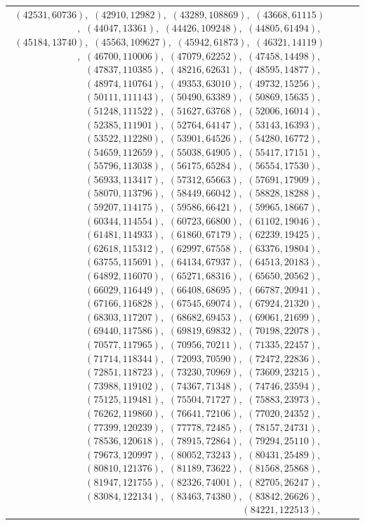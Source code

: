 \documentclass[11pt]{article}
\begin{document}
\begin{longtable}{@{}rrl>{\raggedright\arraybackslash}p{}@{}}
$(42531,60736)$,\allowbreak\ $(42910,12982)$,\allowbreak\ $(43289,108869)$,\allowbreak\ $(43668,61115)$,\allowbreak\ $(44047,13361)$,\allowbreak\ $(44426,109248)$,\allowbreak\ $(44805,61494)$,\allowbreak\ $(45184,13740)$,\allowbreak\ $(45563,109627)$,\allowbreak\ $(45942,61873)$,\allowbreak\ $(46321,14119)$,\allowbreak\ $(46700,110006)$,\allowbreak\ $(47079,62252)$,\allowbreak\ $(47458,14498)$,\allowbreak\ $(47837,110385)$,\allowbreak\ $(48216,62631)$,\allowbreak\ $(48595,14877)$,\allowbreak\ $(48974,110764)$,\allowbreak\ $(49353,63010)$,\allowbreak\ $(49732,15256)$,\allowbreak\ $(50111,111143)$,\allowbreak\ $(50490,63389)$,\allowbreak\ $(50869,15635)$,\allowbreak\ $(51248,111522)$,\allowbreak\ $(51627,63768)$,\allowbreak\ $(52006,16014)$,\allowbreak\ $(52385,111901)$,\allowbreak\ $(52764,64147)$,\allowbreak\ $(53143,16393)$,\allowbreak\ $(53522,112280)$,\allowbreak\ $(53901,64526)$,\allowbreak\ $(54280,16772)$,\allowbreak\ $(54659,112659)$,\allowbreak\ $(55038,64905)$,\allowbreak\ $(55417,17151)$,\allowbreak\ $(55796,113038)$,\allowbreak\ $(56175,65284)$,\allowbreak\ $(56554,17530)$,\allowbreak\ $(56933,113417)$,\allowbreak\ $(57312,65663)$,\allowbreak\ $(57691,17909)$,\allowbreak\ $(58070,113796)$,\allowbreak\ $(58449,66042)$,\allowbreak\ $(58828,18288)$,\allowbreak\ $(59207,114175)$,\allowbreak\ $(59586,66421)$,\allowbreak\ $(59965,18667)$,\allowbreak\ $(60344,114554)$,\allowbreak\ $(60723,66800)$,\allowbreak\ $(61102,19046)$,\allowbreak\ $(61481,114933)$,\allowbreak\ $(61860,67179)$,\allowbreak\ $(62239,19425)$,\allowbreak\ $(62618,115312)$,\allowbreak\ $(62997,67558)$,\allowbreak\ $(63376,19804)$,\allowbreak\ $(63755,115691)$,\allowbreak\ $(64134,67937)$,\allowbreak\ $(64513,20183)$,\allowbreak\ $(64892,116070)$,\allowbreak\ $(65271,68316)$,\allowbreak\ $(65650,20562)$,\allowbreak\ $(66029,116449)$,\allowbreak\ $(66408,68695)$,\allowbreak\ $(66787,20941)$,\allowbreak\ $(67166,116828)$,\allowbreak\ $(67545,69074)$,\allowbreak\ $(67924,21320)$,\allowbreak\ $(68303,117207)$,\allowbreak\ $(68682,69453)$,\allowbreak\ $(69061,21699)$,\allowbreak\ $(69440,117586)$,\allowbreak\ $(69819,69832)$,\allowbreak\ $(70198,22078)$,\allowbreak\ $(70577,117965)$,\allowbreak\ $(70956,70211)$,\allowbreak\ $(71335,22457)$,\allowbreak\ $(71714,118344)$,\allowbreak\ $(72093,70590)$,\allowbreak\ $(72472,22836)$,\allowbreak\ $(72851,118723)$,\allowbreak\ $(73230,70969)$,\allowbreak\ $(73609,23215)$,\allowbreak\ $(73988,119102)$,\allowbreak\ $(74367,71348)$,\allowbreak\ $(74746,23594)$,\allowbreak\ $(75125,119481)$,\allowbreak\ $(75504,71727)$,\allowbreak\ $(75883,23973)$,\allowbreak\ $(76262,119860)$,\allowbreak\ $(76641,72106)$,\allowbreak\ $(77020,24352)$,\allowbreak\ $(77399,120239)$,\allowbreak\ $(77778,72485)$,\allowbreak\ $(78157,24731)$,\allowbreak\ $(78536,120618)$,\allowbreak\ $(78915,72864)$,\allowbreak\ $(79294,25110)$,\allowbreak\ $(79673,120997)$,\allowbreak\ $(80052,73243)$,\allowbreak\ $(80431,25489)$,\allowbreak\ $(80810,121376)$,\allowbreak\ $(81189,73622)$,\allowbreak\ $(81568,25868)$,\allowbreak\ $(81947,121755)$,\allowbreak\ $(82326,74001)$,\allowbreak\ $(82705,26247)$,\allowbreak\ $(83084,122134)$,\allowbreak\ $(83463,74380)$,\allowbreak\ $(83842,26626)$,\allowbreak\ $(84221,122513)$,\allowbreak\ 
\end{longtable}
\end{document}
